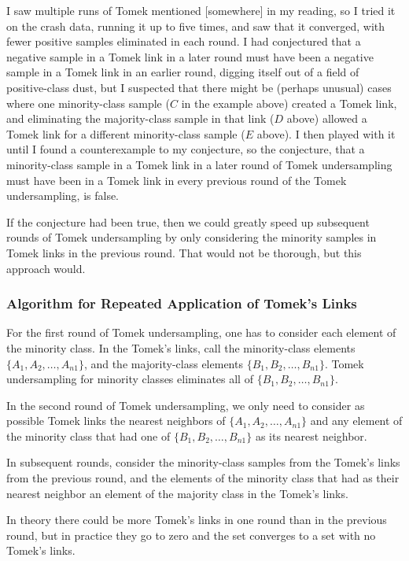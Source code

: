 I saw multiple runs of Tomek mentioned [somewhere] in my reading, so  I tried it on the crash data, running it up to five times, and saw that it converged, with fewer positive samples eliminated in each round.  I had conjectured that a negative sample in a Tomek link in a later round must have been a negative sample in a Tomek link in an earlier round, digging itself out of a field of positive-class dust, but I suspected that there might be (perhaps unusual) cases where one minority-class sample ($C$ in the example above) created a Tomek link, and eliminating the majority-class sample in that link ($D$ above) allowed a Tomek link for a different minority-class sample ($E$ above).  I then played with it until I found a counterexample to my conjecture, so the conjecture, that a minority-class sample in a Tomek link in a later round of Tomek undersampling must have been in a Tomek link in every previous round of the Tomek undersampling, is false.  

If the conjecture had been true, then we could greatly speed up subsequent rounds of Tomek undersampling by only considering the minority samples in Tomek links in the previous round.  That would not be thorough, but this approach would.  

\subsubsection{Algorithm for Repeated Application of Tomek's Links}

	For the first round of Tomek undersampling, one has to consider each element of the minority class.  In the Tomek's links, call the minority-class elements $\{A_{1}, A_{2}, \dots, A_{n1}\}$, and the majority-class elements $\{B_1, B_2, \dots, B_{n1}\}$.  Tomek undersampling for minority classes eliminates all of $\{B_1, B_2, \dots, B_{n1}\}$.
	
	In the second round of Tomek undersampling, we only need to consider as possible Tomek links the nearest neighbors of $\{A_{1}, A_{2}, \dots, A_{n1}\}$ and any element of the minority class that had one of $\{B_1, B_2, \dots, B_{n1}\}$ as its nearest neighbor.
	
In subsequent rounds, consider the minority-class samples from the Tomek's links from the previous round, and the elements of the minority class that had as their nearest neighbor an element of the majority class in the Tomek's links.  

In theory there could be more Tomek's links in one round than in the previous round, but in practice they go to zero and the set converges to a set with no Tomek's links.  

